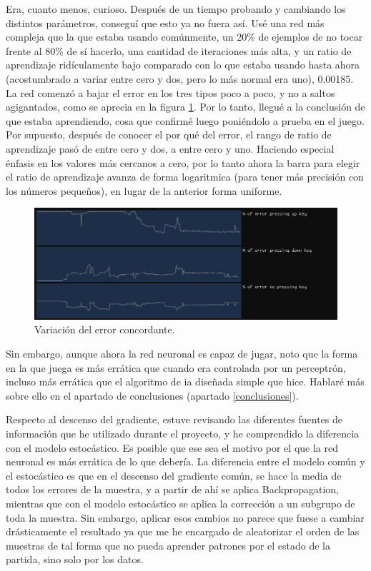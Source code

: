 Era, cuanto menos, curioso. Después de un tiempo probando y cambiando los distintos parámetros, conseguí que esto ya no fuera así. Usé una red más compleja que la que estaba usando comúnmente, un 20\% de ejemplos de no tocar frente al 80\% de sí hacerlo, una cantidad de iteraciones más alta, y un ratio de aprendizaje ridículamente bajo comparado con lo que estaba usando hasta ahora (acostumbrado a variar entre cero y dos, pero lo más normal era uno), 0.00185. La red comenzó a bajar el error en los tres tipos poco a poco, y no a saltos agigantados, como se aprecia en la figura \ref{error concordante}. Por lo tanto, llegué a la conclusión de que estaba aprendiendo, cosa que confirmé luego poniéndolo a prueba en el juego.
\\
Por supuesto, después de conocer el por qué del error, el rango de ratio de aprendizaje pasó de entre cero y dos, a entre cero y uno. Haciendo especial énfasis en los valores más cercanos a cero, por lo tanto ahora la barra para elegir el ratio de aprendizaje avanza de forma logaritmica (para tener más precisión con los números pequeños), en lugar de la anterior forma uniforme.
\begin{figure}[H]
	\centering
	\includegraphics[width=15cm]{archivos/imagenes/error-concordante.png}
	\caption{Variación del error concordante.}
	\label{error concordante}
\end{figure}

Sin embargo, aunque ahora la red neuronal es capaz de jugar, noto que la forma en la que juega es más errática que cuando era controlada por un perceptrón, incluso más errática que el algoritmo de \gls{ia} diseñada simple que hice. Hablaré más sobre ello en el apartado de conclusiones (apartado \ref{conclusiones}).

Respecto al descenso del gradiente, estuve revisando las diferentes fuentes de información que he utilizado durante el proyecto, y he comprendido la diferencia con el modelo estocástico. Es posible que ese sea el motivo por el que la red neuronal es más errática de lo que debería. La diferencia entre el modelo común y el estocástico es que en el descenso del gradiente común, se hace la media de todos los errores de la muestra, y a partir de ahí se aplica Backpropagation, mientras que con el modelo estocástico se aplica la corrección a un subgrupo de toda la muestra. Sin embargo, aplicar esos cambios no parece que fuese a cambiar drásticamente el resultado ya que me he encargado de aleatorizar el orden de las muestras de tal forma que no pueda aprender patrones por el estado de la partida, sino solo por los datos.

